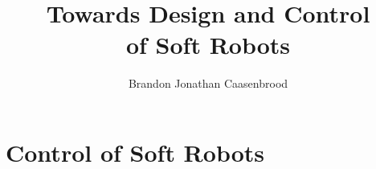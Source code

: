 \documentclass[12pt]{phd}
\title{Towards Design and Control \\ of Soft Robots}
\author{Brandon Jonathan Caasenbrood}
\begin{document}
%

% 
%
%
%
\chapter{Control of Soft Robots}




\appendix




\end{document}

